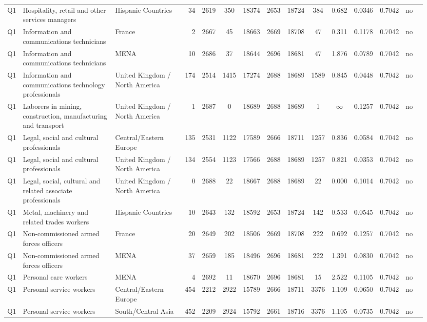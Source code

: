 \begin{longtable}{lllrcccccccccll}
Q1 & Hospitality, retail and other services managers & Hispanic Countries & 34 & 2619 & 350 & 18374 & 2653 & 18724 & 384 & 0.682 & 0.0346 & 0.7042 & no \\
Q1 & Information and communications technicians & France & 2 & 2667 & 45 & 18663 & 2669 & 18708 & 47 & 0.311 & 0.1178 & 0.7042 & no \\
Q1 & Information and communications technicians & MENA & 10 & 2686 & 37 & 18644 & 2696 & 18681 & 47 & 1.876 & 0.0789 & 0.7042 & no \\
Q1 & Information and communications technology professionals & United Kingdom / North America & 174 & 2514 & 1415 & 17274 & 2688 & 18689 & 1589 & 0.845 & 0.0448 & 0.7042 & no \\
Q1 & Laborers in mining, construction, manufacturing and transport & United Kingdom / North America & 1 & 2687 & 0 & 18689 & 2688 & 18689 & 1 & $\infty$ & 0.1257 & 0.7042 & no \\
Q1 & Legal, social and cultural professionals & Central/Eastern Europe & 135 & 2531 & 1122 & 17589 & 2666 & 18711 & 1257 & 0.836 & 0.0584 & 0.7042 & no \\
Q1 & Legal, social and cultural professionals & United Kingdom / North America & 134 & 2554 & 1123 & 17566 & 2688 & 18689 & 1257 & 0.821 & 0.0353 & 0.7042 & no \\
Q1 & Legal, social, cultural and related associate professionals & United Kingdom / North America & 0 & 2688 & 22 & 18667 & 2688 & 18689 & 22 & 0.000 & 0.1014 & 0.7042 & no \\
Q1 & Metal, machinery and related trades workers & Hispanic Countries & 10 & 2643 & 132 & 18592 & 2653 & 18724 & 142 & 0.533 & 0.0545 & 0.7042 & no \\
Q1 & Non-commissioned armed forces officers & France & 20 & 2649 & 202 & 18506 & 2669 & 18708 & 222 & 0.692 & 0.1257 & 0.7042 & no \\
Q1 & Non-commissioned armed forces officers & MENA & 37 & 2659 & 185 & 18496 & 2696 & 18681 & 222 & 1.391 & 0.0830 & 0.7042 & no \\
Q1 & Personal care workers & MENA & 4 & 2692 & 11 & 18670 & 2696 & 18681 & 15 & 2.522 & 0.1105 & 0.7042 & no \\
Q1 & Personal service workers & Central/Eastern Europe & 454 & 2212 & 2922 & 15789 & 2666 & 18711 & 3376 & 1.109 & 0.0650 & 0.7042 & no \\
Q1 & Personal service workers & South/Central Asia & 452 & 2209 & 2924 & 15792 & 2661 & 18716 & 3376 & 1.105 & 0.0735 & 0.7042 & no \\

\end{longtable}
